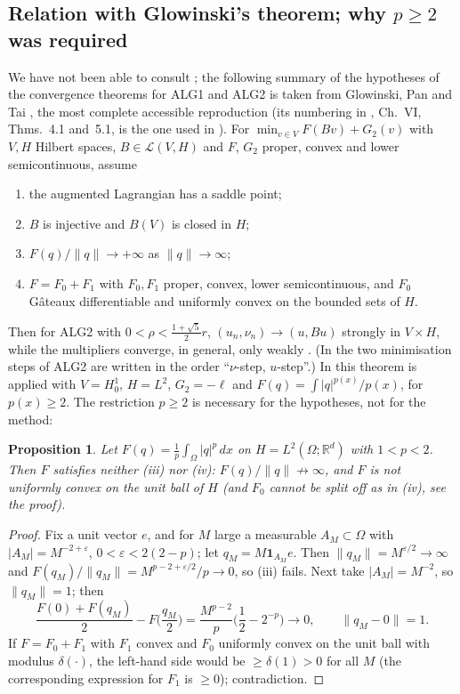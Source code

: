 \documentclass[11pt]{amsart}
\newtheorem{proposition}[theorem]{Proposition}
\theoremstyle{definition}
\theoremstyle{remark}
\numberwithin{equation}{section}
\newcommand{\R}{\mathbb{R}}
\newcommand{\dx}{\,dx}
\newcommand{\abs}[1]{\lvert #1\rvert}
\newcommand{\norm}[1]{\lVert #1\rVert}
\begin{document}
\subsection{Relation with Glowinski's theorem; why $p\ge2$ was required}\label{ssec:glowinski}
We have not been able to consult \cite{Glowinski1984ChVI}; the following summary of the hypotheses of the convergence theorems for ALG1 and ALG2 is taken from Glowinski, Pan and Tai \cite[\S3.2]{GlowinskiPanTai2016}, the most complete accessible reproduction (its numbering in \cite{Glowinski1984ChVI}, Ch.~VI, Thms.~4.1 and~5.1, is the one used in \cite{AragonFBRubio2023,DelPezzoMartinez2014DCM}). For $\min_{v\in V}F(Bv)+G_2(v)$ with $V,H$ Hilbert spaces, $B\in\mathcal L(V,H)$ and $F$, $G_2$ proper, convex and lower semicontinuous, assume
\begin{enumerate}[label=(\roman*),leftmargin=2em]
\item the augmented Lagrangian has a saddle point;
\item $B$ is injective and $B(V)$ is closed in $H$;
\item $F(q)/\norm q\to+\infty$ as $\norm q\to\infty$;
\item $F=F_0+F_1$ with $F_0,F_1$ proper, convex, lower semicontinuous, and $F_0$ G\^ateaux differentiable and uniformly convex on the bounded sets of $H$.
\end{enumerate}
Then for ALG2 with $0<\rho<\frac{1+\sqrt5}2r$, $(u_n,\nu_n)\to(u,Bu)$ strongly in $V\times H$, while the multipliers converge, in general, only weakly \cite{GlowinskiPanTai2016}. (In \cite{GlowinskiPanTai2016} the two minimisation steps of ALG2 are written in the order ``$\nu$-step, $u$-step''.) In \cite[Thm.~4.3]{AragonFBRubio2023} this theorem is applied with $V=H^1_0$, $H=L^2$, $G_2=-\ell$ and $F(q)=\int\abs q^{p(x)}/p(x)$, for $p(x)\ge2$. The restriction $p\ge2$ is necessary for the hypotheses, not for the method:

\begin{proposition}\label{prop:glowinski-pless2}
Let $F(q)=\frac1p\int_\Omega\abs q^p\dx$ on $H=L^2(\Omega;\R^d)$ with $1<p<2$. Then $F$ satisfies neither \textup{(iii)} nor \textup{(iv)}: $F(q)/\norm q\not\to\infty$, and $F$ is not uniformly convex on the unit ball of $H$ \textup(and $F_0$ cannot be split off as in \textup{(iv)}, see the proof\textup).
\end{proposition}
\begin{proof}
Fix a unit vector $e$, and for $M$ large a measurable $A_M\subset\Omega$ with $\abs{A_M}=M^{-2+\varepsilon}$, $0<\varepsilon<2(2-p)$; let $q_M=M\mathbf 1_{A_M}e$. Then $\norm{q_M}=M^{\varepsilon/2}\to\infty$ and $F(q_M)/\norm{q_M}=M^{p-2+\varepsilon/2}/p\to0$, so (iii) fails. Next take $\abs{A_M}=M^{-2}$, so $\norm{q_M}=1$; then
\[
\frac{F(0)+F(q_M)}2-F\Big(\frac{q_M}2\Big)=\frac{M^{p-2}}p\Big(\frac12-2^{-p}\Big)\to0,\qquad\norm{q_M-0}=1 .
\]
If $F=F_0+F_1$ with $F_1$ convex and $F_0$ uniformly convex on the unit ball with modulus $\delta(\cdot)$, the left-hand side would be $\ge\delta(1)>0$ for all $M$ (the corresponding expression for $F_1$ is $\ge0$); contradiction.
\end{proof}
\end{document}

